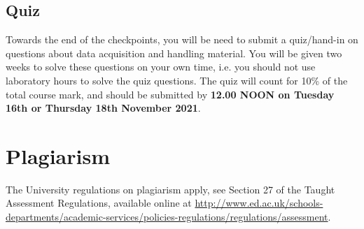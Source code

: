 \subsection{Quiz}

Towards the end of the checkpoints, you will be need to submit a quiz/hand-in on questions about data acquisition and handling material.
You will be given two weeks to solve these questions on your own time, i.e. you should not use laboratory hours to solve the quiz questions.
The quiz will count for 10\% of the total course mark, and should be submitted by {\bf 12.00 NOON on Tuesday 16th or Thursday 18th November 2021}.

\section{Plagiarism}

The University regulations on plagiarism apply, see Section 27 of the Taught Assessment Regulations, available online at \url{http://www.ed.ac.uk/schools-departments/academic-services/policies-regulations/regulations/assessment}.

